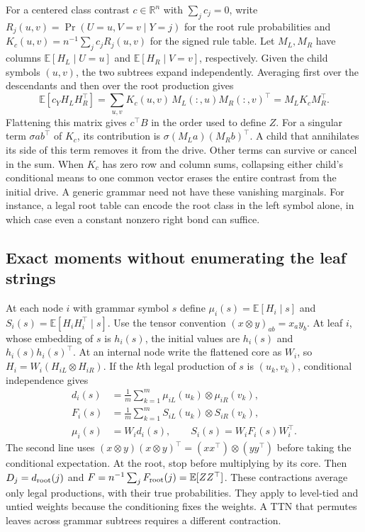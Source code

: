For a centered class contrast $c\in\mathbb R^n$ with $\sum_j c_j=0$,
write $R_j(u,v)=\Pr(U=u,V=v\mid Y=j)$ for the root rule probabilities
and $K_c(u,v)=n^{-1}\sum_j c_jR_j(u,v)$ for the signed rule table.
Let $M_L,M_R$ have columns $\mathbb E[H_L\mid U=u]$ and
$\mathbb E[H_R\mid V=v]$, respectively. Given the child symbols
$(u,v)$, the two subtrees expand independently. Averaging first over the
descendants and then over the root production gives
\begin{equation}
 \mathbb E[c_YH_LH_R^\top]
 =\sum_{u,v}K_c(u,v)\,M_L(:,u)M_R(:,v)^\top
 =M_LK_c M_R^\top .
 \label{eq:cat-contrast}
\end{equation}
Flattening this matrix gives $c^\top B$ in the order used to define $Z$.
For a singular term $\sigma a b^\top$ of $K_c$, its contribution is
$\sigma(M_La)(M_Rb)^\top$. A child that annihilates its side of this term
removes it from the drive. Other terms can survive or cancel in the sum.
When $K_c$ has zero row and column sums, collapsing either child's
conditional means to one common vector erases the entire contrast from
the initial drive. A generic grammar need not have these vanishing
marginals. For instance, a legal root table can encode the root class in
the left symbol alone, in which case even a constant nonzero right bond
can suffice.

\subsection{Exact moments without enumerating the leaf strings}

At each node $i$ with grammar symbol $s$ define
$\mu_i(s)=\mathbb E[H_i\mid s]$ and
$S_i(s)=\mathbb E[H_i H_i^\top\mid s]$. Use the tensor convention
$(x\otimes y)_{ab}=x_a y_b$. At leaf $i$, whose embedding of $s$ is
$h_i(s)$, the initial values are $h_i(s)$ and $h_i(s)h_i(s)^\top$.
At an internal node write the flattened core as $W_i$, so
$H_i=W_i(H_{iL}\otimes H_{iR})$. If the $k$th legal production of $s$
is $(u_k,v_k)$, conditional independence gives
\begin{align}
 d_i(s)&=\frac1m\sum_{k=1}^m \mu_{iL}(u_k)\otimes\mu_{iR}(v_k),\\
 F_i(s)&=\frac1m\sum_{k=1}^m S_{iL}(u_k)\otimes S_{iR}(v_k),\\
 \mu_i(s)&=W_i d_i(s),\qquad S_i(s)=W_i F_i(s)W_i^\top .
 \label{eq:cat-moments}
\end{align}
The second line uses $(x\otimes y)(x\otimes y)^\top
=(xx^\top)\otimes(yy^\top)$ before taking the conditional expectation.
At the root, stop before multiplying by its core. Then $D_j=d_{\rm
root}(j)$ and $F=n^{-1}\sum_j F_{\rm root}(j)=\mathbb E[ZZ^\top]$.
These contractions average only legal productions, with their true
probabilities. They apply to level-tied and untied weights because the
conditioning fixes the weights. A TTN that permutes leaves across
grammar subtrees requires a different contraction.


